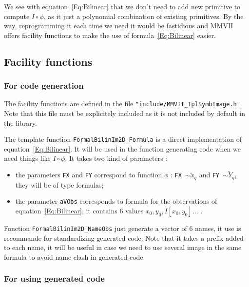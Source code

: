We see with equation~\ref{Eq:Bilinear} that we don't need to add new primitive to compute $I \circ \phi$,
as it just a polynomial combination of existing primitives. By the way, reprogramming it
each time we need it would be fastidious and MMVII offers facility functions to make the use of 
formula~\ref{Eq:Bilinear}  easier.

\subsection{Facility functions}

\subsubsection{For code generation}

The facility functions are defined in the file {\tt "include/MMVII\_TplSymbImage.h"}. Note that this file 
must be explicitely included as it is not included by default in the library.

The template function {\tt FormalBilinIm2D\_Formula} is a direct implementation of equation~\ref{Eq:Bilinear}.
It will be used in the function generating code when we need things like $I \circ \phi$.
It takes two kind of parameters :

\begin{itemize}
   \item the parameters {\tt FX} and {\tt FY} correspond to function $\phi$ :  
	  {\tt FX $\sim \tilde{x}_q$} and {\tt FY $\sim \tilde{Y}_q$}, 
         they will be of type formulas; 

   \item the parameter {\tt aVObs}  corresponds to formula for the observations of equation~\ref{Eq:Bilinear},
         it contains $6$ values $x_0,y_0, I[x_0,y_0] \dots$ .
\end{itemize}

Fonction {\tt FormalBilinIm2D\_NameObs} just generate a vector of $6$ names, it use is recommande for standardizing generated code.
Note that it takes a prefix added to  each name, it will be useful in case we need to use several image in the same
formula to avoid name clash in generated code.
	

\subsubsection{For using generated code}

